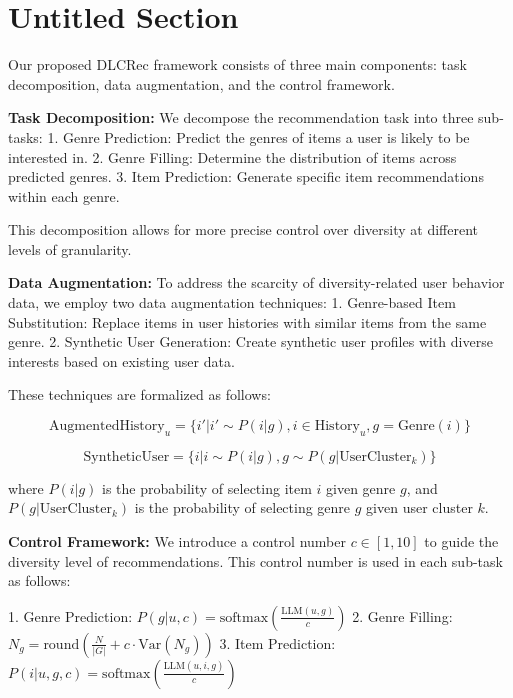 \documentclass[10pt,twocolumn,letterpaper]{article}
\begin{document}
\section{Untitled Section}

Our proposed DLCRec framework consists of three main components: task decomposition, data augmentation, and the control framework.

\textbf{Task Decomposition:}
We decompose the recommendation task into three sub-tasks:
1. Genre Prediction: Predict the genres of items a user is likely to be interested in.
2. Genre Filling: Determine the distribution of items across predicted genres.
3. Item Prediction: Generate specific item recommendations within each genre.

This decomposition allows for more precise control over diversity at different levels of granularity.

\textbf{Data Augmentation:}
To address the scarcity of diversity-related user behavior data, we employ two data augmentation techniques:
1. Genre-based Item Substitution: Replace items in user histories with similar items from the same genre.
2. Synthetic User Generation: Create synthetic user profiles with diverse interests based on existing user data.

These techniques are formalized as follows:

\begin{equation}
    \text{AugmentedHistory}_u = \{i' | i' \sim P(i|g), i \in \text{History}_u, g = \text{Genre}(i)\}
\end{equation}

\begin{equation}
    \text{SyntheticUser} = \{i | i \sim P(i|g), g \sim P(g|\text{UserCluster}_k)\}
\end{equation}

where $P(i|g)$ is the probability of selecting item $i$ given genre $g$, and $P(g|\text{UserCluster}_k)$ is the probability of selecting genre $g$ given user cluster $k$.

\textbf{Control Framework:}
We introduce a control number $c \in [1, 10]$ to guide the diversity level of recommendations. This control number is used in each sub-task as follows:

1. Genre Prediction: $P(g|u, c) = \text{softmax}(\frac{\text{LLM}(u, g)}{c})$
2. Genre Filling: $N_g = \text{round}(\frac{N}{|G|} + c \cdot \text{Var}(N_g))$
3. Item Prediction: $P(i|u, g, c) = \text{softmax}(\frac{\text{LLM}(u, i, g)}{c})$
\end{document}

